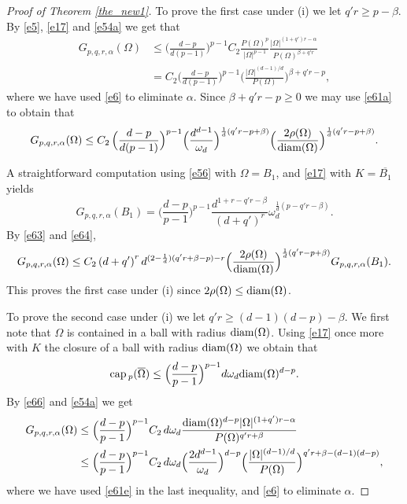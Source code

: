 \documentclass[a4paper,9pt]{article}
\def\cp{\mathrm{cap}\,}
\newcommand{\Om}{\Omega}
\begin{document}
\smallskip


\begin{proof}[Proof of Theorem \ref{the_new1}]

To prove the first case under (i) we let $q'r\ge p-\beta$. By \eqref{e5}, \eqref{e17} and  \eqref{e54a} we get that
\begin{align*}%
G_{p,q,r,\alpha}(\Om)&\le \Big(\frac{d-p}{d(p-1)}\Big)^{p-1}C_2 \frac{P(\Om)^{p}}{|\Om|^{p-1}}\frac{|\Om|^{(1+q')r-\alpha}}{P(\Om)^{\beta+q'r}}\nonumber\\&
=C_2\Big(\frac{d-p}{d(p-1)}\Big)^{p-1}\Big(\frac{|\Om|^{(d-1)/d}}{P(\Om)}\Big)^{\beta+q'r-p},
\end{align*}
where we have used \eqref{e6} to eliminate $\alpha$. Since $\beta+q'r-p\ge 0$ we  may use \eqref{e61a} to obtain that
\begin{equation}\label{e63}
G_{p,q,r,\alpha}(\Om)\le C_2\,\Big(\frac{d-p}{d(p-1)}\Big)^{p-1}\Big(\frac{d^{d-1}}{\omega_d}\Big)^{\frac1d(q'r-p +\beta)}\Big(\frac{2\rho(\Om)}{\textup{diam}(\Om)}\Big)^{\frac1d(q'r-p +\beta)}.
\end{equation}

A straightforward computation using \eqref{e56} with $\Om=B_1$, and \eqref{e17} with $K=\overline{B_1}$ yields
\begin{equation}\label{e64}
 G_{p,q,r,\alpha}(B_1)= \Big(\frac{d-p}{p-1}\Big)^{p-1}  \frac{d^{1+r-q'r -\beta}}{(d+q')^r}\omega_d^{\frac1d(p-q'r -\beta )}.
\end{equation}
By \eqref{e63} and \eqref{e64},
\begin{equation}\label{e65}
G_{p,q,r,\alpha}(\Om)\le C_2\left(d+q'\right)^rd^{(2-\frac1d)(q'r+\beta-p)-r}\Big(\frac{2\rho(\Om)}{\textup{diam}(\Om)}\Big)^{\frac1d(q'r-p+\beta)}G_{p,q,r,\alpha}(B_1).
\end{equation}
This proves the first case under (i) since $2\rho(\Om)\le \textup{diam}(\Om)$.

\smallskip

To prove the second case under (i) we let  $q'r\ge (d-1)(d-p)-\beta$. We first note that $\Om$ is contained in a ball with radius $\textup{diam}(\Om)$.
Using \eqref{e17} once more with $K$ the closure of a ball with radius $\textup{diam}(\Om)$
we obtain that
\begin{equation}\label{e66}
\cp_p(\overline{\Om})\le \Big(\frac{d-p}{p-1}\Big)^{p-1}d\omega_d\textup{diam}(\Om)^{d-p}.
\end{equation}
By \eqref{e66} and  \eqref{e54a} we get
\begin{align*}%
G_{p,q,r,\alpha}(\Om)&\le \Big(\frac{d-p}{p-1}\Big)^{p-1}C_2\,d\omega_d\frac{\textup{diam}(\Om)^{d-p}|\Om|^{(1+q')r-\alpha}}{P(\Om)^{q'r+\beta}}\nonumber\\&
\le \Big(\frac{d-p}{p-1}\Big)^{p-1}C_2\,d\omega_d\Big(\frac{2d^{d-1}}{\omega_d}\Big)^{d-p}\Big(\frac{|\Om|^{(d-1)/d}}{P(\Om)}\Big)^{q'r+\beta-(d-1)(d-p)},
\end{align*}
where we have used \eqref{e61e} in the last inequality, and \eqref{e6} to eliminate $\alpha$.


\end{proof}
\end{document}
